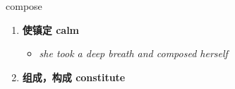 
\begin{frame}
{\huge compose}
\begin{center}
\begin{enumerate}\Large
  \item \textbf{使镇定 calm}
  \begin{itemize}
    \item \em{\Large{she took a deep breath and composed herself}}
  \end{itemize}
  \item \textbf{组成，构成 constitute}
\end{enumerate}
\end{center}
\end{frame}
